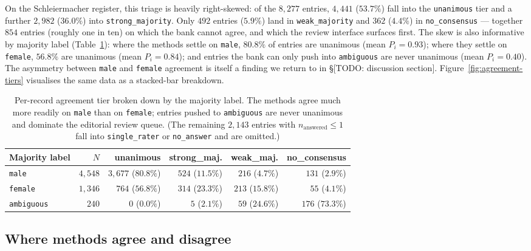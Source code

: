 \documentclass{eceasst}
\begin{document}
On the Schleiermacher register, this triage is heavily right-skewed: of the $8{,}277$ entries, $4{,}441$ ($53.7\%$) fall into the \texttt{unanimous} tier and a further $2{,}982$ ($36.0\%$) into \texttt{strong\_majority}. Only $492$ entries ($5.9\%$) land in \texttt{weak\_majority} and $362$ ($4.4\%$) in \texttt{no\_consensus} --- together $854$ entries (roughly one in ten) on which the bank cannot agree, and which the review interface surfaces first. The skew is also informative by majority label (Table~\ref{tab:tier-by-label}): where the methods settle on \texttt{male}, $80.8\%$ of entries are unanimous (mean $P_i = 0.93$); where they settle on \texttt{female}, $56.8\%$ are unanimous (mean $P_i = 0.84$); and entries the bank can only push into \texttt{ambiguous} are never unanimous (mean $P_i = 0.40$). The asymmetry between \texttt{male} and \texttt{female} agreement is itself a finding we return to in \S[TODO: discussion section]. Figure~\ref{fig:agreement-tiers} visualises the same data as a stacked-bar breakdown.

\begin{table}[h]
  \centering
  \small
  \begin{tabular}{lrrrrr}
    \toprule
    Majority label & $N$ & unanimous & strong\_maj. & weak\_maj. & no\_consensus \\
    \midrule
    \texttt{male}      & $4{,}548$ & $3{,}677$ ($80.8\%$) & $524$ ($11.5\%$) & $216$ ($4.7\%$) & $131$ ($2.9\%$) \\
    \texttt{female}    & $1{,}346$ & $764$ ($56.8\%$)     & $314$ ($23.3\%$) & $213$ ($15.8\%$) & $55$ ($4.1\%$)  \\
    \texttt{ambiguous} & $240$     & $0$ ($0.0\%$)        & $5$ ($2.1\%$)    & $59$ ($24.6\%$)  & $176$ ($73.3\%$) \\
    \bottomrule
  \end{tabular}
  \caption{Per-record agreement tier broken down by the majority label. The methods agree much more readily on \texttt{male} than on \texttt{female}; entries pushed to \texttt{ambiguous} are never unanimous and dominate the editorial review queue. (The remaining $2{,}143$ entries with $n_{\text{answered}} \le 1$ fall into \texttt{single\_rater} or \texttt{no\_answer} and are omitted.)}
  \label{tab:tier-by-label}
\end{table}



\subsection{Where methods agree and disagree}
\end{document}
